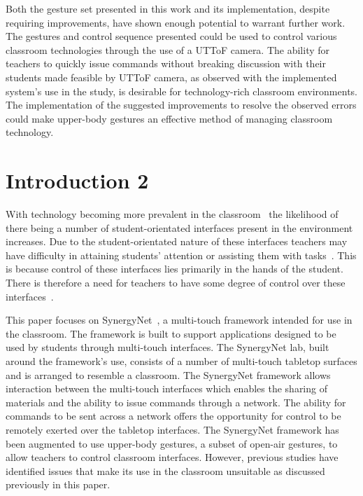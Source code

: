 \documentclass[manuscript, review, screen]{acmart}
\begin{document}
Both the gesture set presented in this work and its implementation, despite requiring improvements, have shown enough potential to warrant further work.
The gestures and control sequence presented could be used to control various classroom technologies through the use of a \ac{UTToF} camera.
The ability for teachers to quickly issue commands without breaking discussion with their students made feasible by \ac{UTToF} camera, as observed with the implemented system's use in the study, is desirable for technology-rich classroom environments.
The implementation of the suggested improvements to resolve the observed errors could make upper-body gestures an effective method of managing classroom technology.


\section{Introduction 2}
\label{sec:intro2}




With technology becoming more prevalent in the classroom~\cite{Lloyd2011,Robertson2012,Schrum2008} the likelihood of there being a number of student-orientated interfaces present in the environment increases.
Due to the student-orientated nature of these interfaces teachers may have difficulty in attaining students' attention or assisting them with tasks~\cite{Chen2005,Karabenick2011}.
This is because control of these interfaces lies primarily in the hands of the student.
There is therefore a need for teachers to have some degree of control over these interfaces~\cite{Apple1990,Selwyn2010,Selwyn2011}.

This paper focuses on SynergyNet~\cite{HatchA.HigginsS&Mercier2009}, a multi-touch framework intended for use in the classroom.
The framework is built to support applications designed to be used by students through multi-touch interfaces.
The SynergyNet lab, built around the framework's use, consists of a number of multi-touch tabletop surfaces and is arranged to resemble a classroom.
The SynergyNet framework allows interaction between the multi-touch interfaces which enables the sharing of materials and the ability to issue commands through a network.
The ability for commands to be sent across a network offers the opportunity for control to be remotely exerted over the tabletop interfaces.
The SynergyNet framework has been augmented to use upper-body gestures, a subset of open-air gestures, to allow teachers to control classroom interfaces.
However, previous studies have identified issues that make its use in the classroom unsuitable as discussed previously in this paper.
\end{document}
